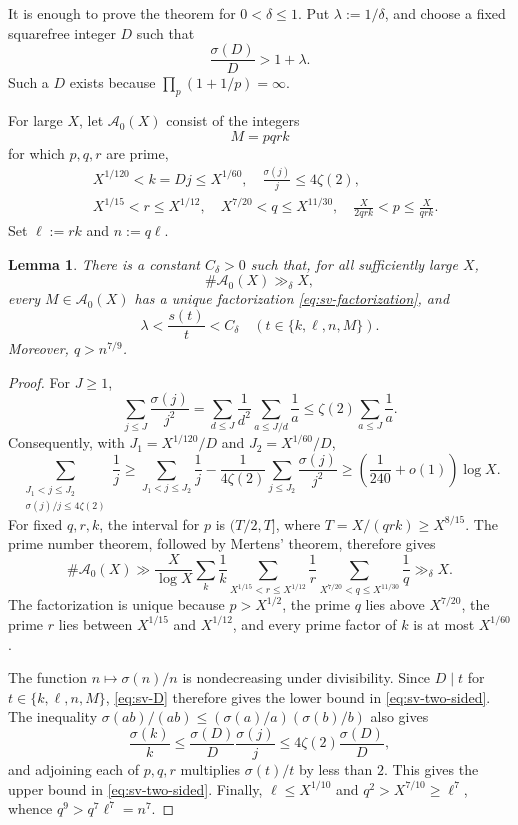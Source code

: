 \documentclass[11pt,letterpaper,reqno]{amsart}
\numberwithin{equation}{section}
\newtheorem{lemma}[theorem]{Lemma}
\theoremstyle{remark}
\renewcommand{\leq}{\leqslant}
\renewcommand{\geq}{\geqslant}
\begin{document}
It is enough to prove the theorem for $0<\delta\leq1$. Put
$\lambda:=1/\delta$, and choose a fixed squarefree integer $D$ such that
\begin{equation}\label{eq:sv-D}
 \frac{\sigma(D)}D>1+\lambda.
\end{equation}
Such a $D$ exists because $\prod_{p}(1+1/p)=\infty$.

For large $X$, let $\mathcal{A}_0(X)$ consist of the integers
\begin{equation}\label{eq:sv-factorization}
 M=pqrk
\end{equation}
for which $p,q,r$ are prime,
\begin{align*}
 &X^{1/120}<k=Dj\leq X^{1/60},
 \quad \frac{\sigma(j)}j\leq4\zeta(2),\\
 &X^{1/15}<r\leq X^{1/12},
 \quad X^{7/20}<q\leq X^{11/30},
 \quad \frac{X}{2qrk}<p\leq\frac{X}{qrk}.
\end{align*}
Set $\ell:=rk$ and $n:=q\ell$.

\begin{lemma}
There is a constant $C_\delta>0$ such that, for all sufficiently large
$X$,
\[
 \#\mathcal{A}_0(X)\gg_\delta X,
\]
every $M\in\mathcal{A}_0(X)$ has a unique factorization
\eqref{eq:sv-factorization}, and
\begin{equation}\label{eq:sv-two-sided}
 \lambda<\frac{s(t)}t<C_\delta
 \quad(t\in\{k,\ell,n,M\}).
\end{equation}
Moreover, $q>n^{7/9}$.
\end{lemma}

\begin{proof}
For $J\geq1$,
\[
 \sum_{j\leq J}\frac{\sigma(j)}{j^2}
 =\sum_{d\leq J}\frac1{d^2}\sum_{a\leq J/d}\frac1a
 \leq\zeta(2)\sum_{a\leq J}\frac1a.
\]
Consequently, with $J_1=X^{1/120}/D$ and $J_2=X^{1/60}/D$,
\[
 \sum_{\substack{J_1<j\leq J_2\\ \sigma(j)/j\leq4\zeta(2)}}\frac1j
 \geq \sum_{J_1<j\leq J_2}\frac1j
 -\frac1{4\zeta(2)}\sum_{j\leq J_2}\frac{\sigma(j)}{j^2}
 \geq \left(\frac1{240}+o(1)\right)\log X.
\]
For fixed $q,r,k$, the interval for $p$ is $(T/2,T]$, where
$T=X/(qrk)\geq X^{8/15}$. The prime number theorem, followed by Mertens'
theorem, therefore gives
\[
 \#\mathcal{A}_0(X)
 \gg \frac{X}{\log X}
 \sum_k\frac1k
 \sum_{X^{1/15}<r\leq X^{1/12}}\frac1r
 \sum_{X^{7/20}<q\leq X^{11/30}}\frac1q
 \gg_\delta X.
\]
The factorization is unique because $p>X^{1/2}$, the prime $q$ lies above
$X^{7/20}$, the prime $r$ lies between $X^{1/15}$ and $X^{1/12}$, and
every prime factor of $k$ is at most $X^{1/60}$.

The function $n\mapsto\sigma(n)/n$ is nondecreasing under divisibility.
Since $D\mid t$ for $t\in\{k,\ell,n,M\}$, \eqref{eq:sv-D} therefore
gives the lower bound in \eqref{eq:sv-two-sided}. The inequality
$\sigma(ab)/(ab)\leq(\sigma(a)/a)(\sigma(b)/b)$ also gives
\[
 \frac{\sigma(k)}k\leq
 \frac{\sigma(D)}D\frac{\sigma(j)}j
 \leq4\zeta(2)\frac{\sigma(D)}D,
\]
and adjoining each of $p,q,r$ multiplies $\sigma(t)/t$ by less than $2$.
This gives the upper bound in \eqref{eq:sv-two-sided}. Finally,
$\ell\leq X^{1/10}$ and $q^2>X^{7/10}\geq\ell^7$, whence
$q^9>q^7\ell^7=n^7$.
\end{proof}
\end{document}

